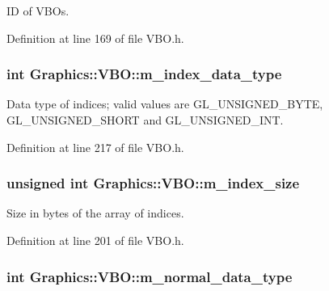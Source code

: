 ID of VBOs. 



Definition at line 169 of file VBO.h.

\hypertarget{class_graphics_1_1_v_b_o_a87e3330b9c688d6981c1b23fcfeab9a5}{
\subsubsection[{m\_\-index\_\-data\_\-type}]{\setlength{\rightskip}{0pt plus 5cm}int {\bf Graphics::VBO::m\_\-index\_\-data\_\-type}}}
\label{class_graphics_1_1_v_b_o_a87e3330b9c688d6981c1b23fcfeab9a5}


Data type of indices; valid values are GL\_\-UNSIGNED\_\-BYTE, GL\_\-UNSIGNED\_\-SHORT and GL\_\-UNSIGNED\_\-INT. 



Definition at line 217 of file VBO.h.

\hypertarget{class_graphics_1_1_v_b_o_a6aee1be4b03097c901914f138cfb70d2}{
\subsubsection[{m\_\-index\_\-size}]{\setlength{\rightskip}{0pt plus 5cm}unsigned int {\bf Graphics::VBO::m\_\-index\_\-size}}}
\label{class_graphics_1_1_v_b_o_a6aee1be4b03097c901914f138cfb70d2}


Size in bytes of the array of indices. 



Definition at line 201 of file VBO.h.

\hypertarget{class_graphics_1_1_v_b_o_acc73a624adcb5819c83fdee509032dc8}{
\subsubsection[{m\_\-normal\_\-data\_\-type}]{\setlength{\rightskip}{0pt plus 5cm}int {\bf Graphics::VBO::m\_\-normal\_\-data\_\-type}}}
\label{class_graphics_1_1_v_b_o_acc73a624adcb5819c83fdee509032dc8}


